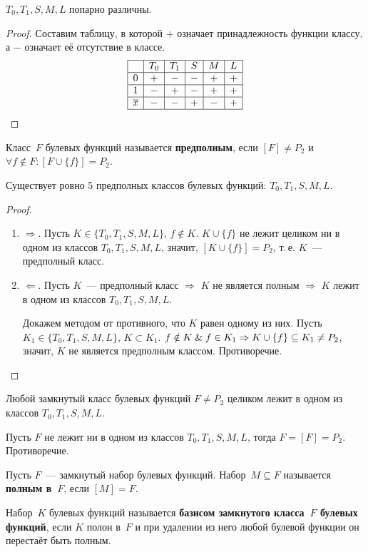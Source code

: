 \begin{statement}
$T_0, T_1, S, M, L$ попарно различны.
\end{statement}
\begin{proof}
Составим таблицу, в которой $+$ означает принадлежность функции классу, а $-$ означает её отсутствие в классе.
\begin{equation*}
\begin{array}{|c|c|c|c|c|c|}
\hline
  & T_0 & T_1 & S & M & L \\
  \hline
0 & + & - & - & + & + \\
\hline
1 & - & + & - & + & + \\
\hline
\overline x & - & - & + & - & + \\
\hline
\end{array}
\end{equation*}
\end{proof}

Класс~$F$ булевых функций называется \textbf{предполным}, если $[F] \neq P_2$ и $\forall f \notin F \colon [F \cup \{ f \}] = P_2$.

\begin{statement}
Существует ровно 5 предполных классов булевых функций: $T_0, T_1, S, M, L$.
\end{statement}
\begin{proof}
\begin{enumerate}
	\item $\Rightarrow$. Пусть $K \in \{ T_0, T_1, S, M, L \}$, $f \notin K$.
	$K \cup \{ f \}$ не лежит целиком ни в одном из классов $T_0, T_1, S, M, L$, значит, $[K \cup \{ f \}] = P_2$, т.\,е. $K$~--- предполный класс.
	\item $\Leftarrow$. Пусть $K$~--- предполный класс $\Rightarrow$ $K$ не является полным $\Rightarrow$ $K$ лежит в одном из классов $T_0, T_1, S, M, L$.
	
	Докажем методом от противного, что $K$ равен одному из них.
	Пусть $K_1 \in \{ T_0, T_1, S, M, L \}$, $K \subset K_1$.
	$f \notin K \mathrel{\&} f \in K_1 \Rightarrow K \cup \{ f \} \subseteq K_1 \neq P_2$, значит, $K$ не является предполным классом.
	Противоречие.
\end{enumerate}
\end{proof}

\begin{consequent}
Любой замкнутый класс булевых функций $F \neq P_2$ целиком лежит в одном из классов $T_0, T_1, S, M, L$.
\end{consequent}
\begin{proofcontra}
Пусть $F$ не лежит ни в одном из классов $T_0, T_1, S, M, L$, тогда $F = [F] = P_2$.
Противоречие.
\end{proofcontra}

Пусть $F$~--- замкнутый набор булевых функций. Набор~$M \subseteq F$ называется \textbf{полным в~$F$}, если $[M] = F$.

 Набор~$K$ булевых функций называется \textbf{базисом замкнутого класса~$F$ булевых функций}, если $K$ полон в~$F$ и при удалении из него любой булевой функции он перестаёт быть полным.